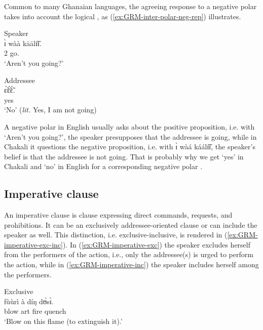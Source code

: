 Common to many Ghanaian languages, the  agreeing response to a  negative polar  takes into account the logical , as (\ref{ex:GRM-inter-polar-neg-rep}) illustrates. 

\ea\label{ex:GRM-inter-polar-neg-rep}
\ea\label{ex:GRM-inter-polar-neg-rep-S}{\rm Speaker}\\
\gll  ɪ̀ wàà kāālɪ̏ɪ̏.\\
{2\sg} {\neg} go.{\q}\\
\glt `Aren't you going?'

\ex\label{ex:GRM-inter-polar-neg-rep-A}{\rm Addressee}\\
\gll ɛ̃̀ɛ̃́ɛ̃̀.\\
yes\\
\glt `No' ({\it lit.} Yes, I am not going)

\z 
 \z
 
A negative polar  in English usually asks about the positive proposition, i.e. with `Aren't you going?',  the speaker presupposes that the addressee is going,   while in Chakali it questions the negative proposition, i.e. with {\sls  ɪ̀ wàá káálɪ̏ɪ̏},  the speaker's belief is that the addressee is not going. That is probably why we get `yes' in Chakali and `no' in English for a corresponding negative polar .

\subsection{Imperative clause}
\label{sec:GRM-imper-clause}

An imperative clause is clause expressing direct commands, requests, and prohibitions. It can be an exclusively addressee-oriented clause or  can include the speaker as well. This distinction, i.e. exclusive-inclusive, is rendered in  (\ref{ex:GRM-imperative-exc-inc}). In (\ref{ex:GRM-imperative-exc}) the  speaker excludes herself  from the performers of the action, i.e., only the addressee(s) is urged to perform the action,  while in  (\ref{ex:GRM-imperative-inc}) the speaker includes herself among the performers.



\ea\label{ex:GRM-imperative-exc-inc}
\ea\label{ex:GRM-imperative-exc}{\rm Exclusive}\\
\gll fùùrì à díŋ dʊ̀sɪ̀.\\
blow {\sc art} fire quench\\
\glt `Blow on this flame (to extinguish it).'

